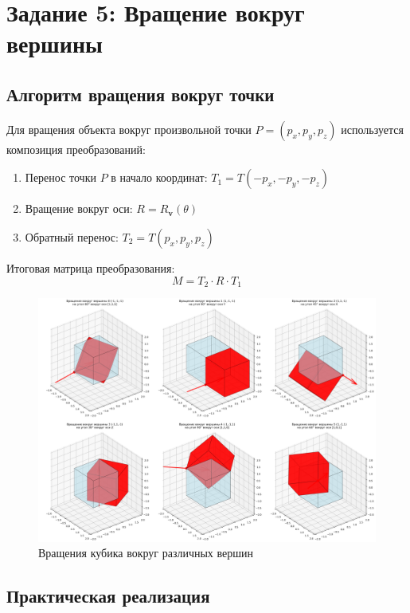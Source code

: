 \section*{Задание 5: Вращение вокруг вершины}

\subsection*{Алгоритм вращения вокруг точки}

Для вращения объекта вокруг произвольной точки $P = (p_x, p_y, p_z)$ используется композиция преобразований:

\begin{enumerate}
\item Перенос точки $P$ в начало координат: $T_1 = T(-p_x, -p_y, -p_z)$
\item Вращение вокруг оси: $R = R_{\mathbf{v}}(\theta)$
\item Обратный перенос: $T_2 = T(p_x, p_y, p_z)$
\end{enumerate}

Итоговая матрица преобразования:
\begin{equation}
M = T_2 \cdot R \cdot T_1
\end{equation}

\begin{figure}[h]
\centering
\includegraphics[width=\textwidth]{images/task5/rotation_around_vertices.png}
\caption{Вращения кубика вокруг различных вершин}
\label{fig:rotation_around_vertices}
\end{figure}

\subsection*{Практическая реализация}


